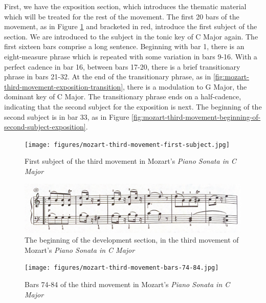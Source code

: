 First, we have the exposition section, which introduces the thematic material which will be treated for the rest of the movement. The first 20 bars of the movement, as in Figure \ref{fig:mozart-third-movement-first-subject}\autocite{Henle_1977} and bracketed in red, introduce the first subject of the section. We are introduced to the subject in the tonic key of C Major again. The first sixteen bars comprise a long sentence. Beginning with bar 1, there is an eight-measure phrase which is repeated with some variation in bars 9-16. With a perfect cadence in bar 16, between bars 17-20, there is a brief transitionary phrase in bars 21-32. At the end of the transitionary phrase, as in \ref{fig:mozart-third-movement-exposition-transition}\autocite{Henle_1977}, there is a modulation to G Major, the dominant key of C Major. The transitionary phrase ends on a half-cadence, indicating that the second subject for the exposition is next. The beginning of the second subject is in bar 33, as in Figure \ref{fig:mozart-third-movement-beginning-of-second-subject-exposition}\autocite{Henle_1977}. 

\begin{figure}
	\centering
	\texttt{[image: figures/mozart-third-movement-first-subject.jpg]}
	\caption{First subject of the third movement in Mozart's \textit{Piano Sonata in C Major}}
	\label{fig:mozart-third-movement-first-subject}
\end{figure}

\begin{figure}
	\centering
	\includegraphics[width=\textwidth]{figures/mozart-third-movement-development-section-first-six-bars.jpg}
	\caption[The development section of Movement III, in Mozart's \textit{Piano Sonata in C Major}]{The beginning of the development section, in the third movement of Mozart's \textit{Piano Sonata in C Major}}
	\label{fig:mozart-third-movement-development-section-first-six-bars}
\end{figure}

\begin{figure}
	\centering
	\texttt{[image: figures/mozart-third-movement-bars-74-84.jpg]}
	\caption{Bars 74-84 of the third movement in Mozart's \textit{Piano Sonata in C Major}}
	\label{fig:mozart-third-movement-bars-74-84}
\end{figure}

